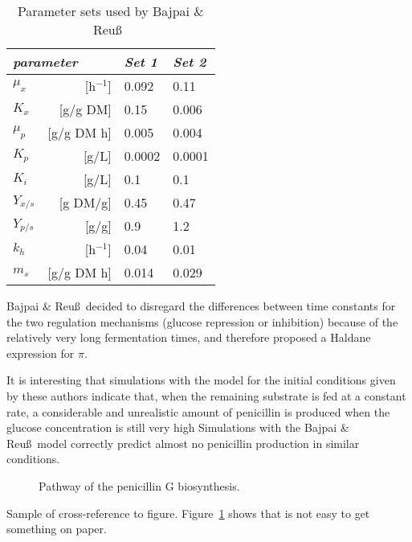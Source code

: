 \documentclass[dvips,aoas,preprint]{imsart}
\numberwithin{equation}{section}
\theoremstyle{plain}
\begin{document}
\begin{table}
\centering
\caption{Parameter sets used by Bajpai \& Reu\ss\ }\label{parset}
\begin{tabular}{lrll}
\hline
\multicolumn{2}{l}{\it parameter} & {\it Set 1} & {\it Set 2}\\
\hline
$\mu_{x}$           & [h$^{-1}$]  & 0.092       & 0.11          \\
$K_{x}$             & [g/g DM]     & 0.15        & 0.006         \\
$\mu_{p}$           & [g/g DM h]  & 0.005       & 0.004         \\
$K_{p}$             & [g/L]        & 0.0002      & 0.0001        \\
$K_{i}$             & [g/L]        & 0.1         & 0.1           \\
$Y_{x/s}$           & [g DM/g]     & 0.45        & 0.47          \\
$Y_{p/s}$           & [g/g]        & 0.9         & 1.2           \\
$k_{h}$             & [h$^{-1}$]  & 0.04        & 0.01          \\
$m_{s}$             & [g/g DM h]  & 0.014       & 0.029         \\
\hline
\end{tabular}
\end{table}

Bajpai \& Reu\ss\ decided to disregard the
differences between time constants for the two regulation mechanisms
(glucose repression or inhibition) because of the
relatively very long fermentation times, and therefore proposed a Haldane
expression for $\pi$.

It is interesting that simulations with the \cite{r4} model for the
initial conditions given by these authors indicate that, when the
remaining substrate is fed at a constant rate, a considerable and
unrealistic amount of penicillin is
produced when the glucose concentration is still very high \cite{r2,r3,r4}
Simulations with the Bajpai \& Reu\ss\ model correctly predict almost
no penicillin production in similar conditions.

\begin{figure} %
\vspace{6pc}
\caption[]{Pathway of the penicillin G biosynthesis.}
\label{penG}
\end{figure}

Sample of cross-reference to figure.
Figure~\ref{penG} shows that is not easy to get something on paper.
\end{document}
